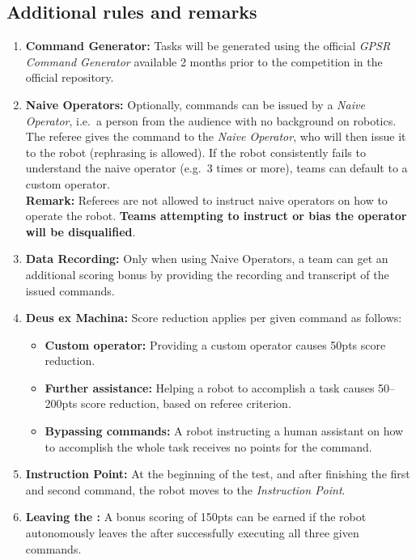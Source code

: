 %
%
\subsection*{Additional rules and remarks}
\begin{enumerate}[nosep]
	\item \textbf{Command Generator:} Tasks will be generated using the official \emph{GPSR Command Generator} available 2 months prior to the competition in the official repository.

	\item \textbf{Naive Operators:} Optionally, commands can be issued by a \emph{Naive Operator}, i.e.~a person from the audience with no background on robotics. The referee gives the command to the \emph{Naive Operator}, who will then issue it to the robot (rephrasing is allowed). If the robot consistently fails to understand the naive operator (e.g.~3 times or more), teams can default to a custom operator.
	\\[2mm]\textbf{Remark:} Referees are not allowed to instruct naive operators on how to operate the robot. \textbf{Teams attempting to instruct or bias the operator will be disqualified}.\\[2mm]

	\item \textbf{Data Recording:} Only when using Naive Operators, a team can get an additional scoring bonus by providing the recording and transcript of the issued commands.

	\item \textbf{Deus ex Machina:} Score reduction applies per given command as follows:
	\begin{itemize}[nosep]
	\item \textbf{Custom operator:} Providing a custom operator causes 50pts score reduction.
	\item \textbf{Further assistance:} Helping a robot to accomplish a task causes 50--200pts score reduction, based on referee criterion.
	\item \textbf{Bypassing commands:} A robot instructing a human assistant on how to accomplish the whole task receives no points for the command.
	\end{itemize}

	\item \textbf{Instruction Point:} At the beginning of the test, and after finishing the first and second command, the robot moves to the \textit{Instruction Point}.

	\item \textbf{Leaving the \Arena{}:} A bonus scoring of 150pts can be earned if the robot autonomously leaves the \Arena{} after successfully executing all three given commands.
\end{enumerate}

